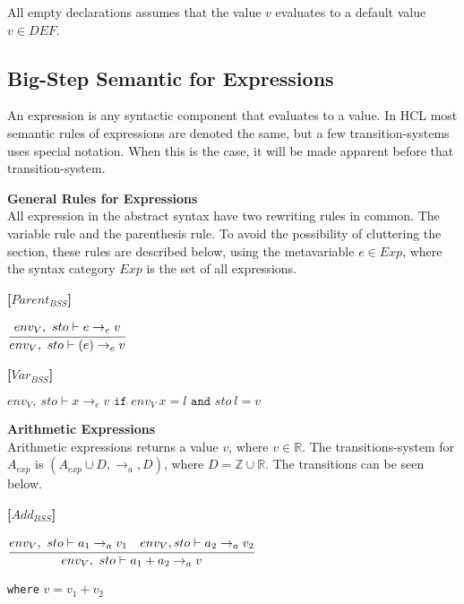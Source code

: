 All empty declarations assumes that the value $v$ evaluates to a default value $v \in DEF$.

\subsection{Big-Step Semantic for Expressions}
An expression is any syntactic component that evaluates to a value.
In HCL most semantic rules of expressions are denoted the same, but a few transition-systems uses special notation.
When this is the case, it will be made apparent before that transition-system.

\textbf{\large{General Rules for Expressions}} \\
All expression in the abstract syntax have two rewriting rules in common.
The variable rule and the parenthesis rule.
To avoid the possibility of cluttering the section, these rules are described below, using the metavariable $e \in Exp$, where the syntax category $Exp$ is the set of all expressions.

\textbf{[$Parent_{BSS}$]}
\begin{center}
	\begin{math}
	\cfrac
		{env_V,\ sto \vdash e \rightarrow_e v}
		{env_V,\ sto \vdash (e) \rightarrow_e v}
	\end{math}
\end{center}

\textbf{[$Var_{BSS}$]}
\begin{center}
	\begin{math}
	env_V,\ sto \vdash x \rightarrow_e v
	\texttt{ if } env_V\ x = l
	\texttt{ and } sto\ l = v
	\end{math}
\end{center}

\textbf{\large{Arithmetic Expressions}}\\
Arithmetic expressions returns a value $v$, where $v \in \mathbb{R}$.
The transitions-system for $A_{exp}$ is $(A_{exp} \cup D, \rightarrow_a, D)$, 
where $D = \mathbb{Z} \cup \mathbb{R}$.
The transitions can be seen below.

\textbf{[$Add_{BSS}$]}\\
\begin{center}
	\begin{math}
	\cfrac
		{env_V,\ sto \vdash a_1 \rightarrow_a v_1 \quad env_V, sto \vdash a_2 \rightarrow_a v_2}
		{env_V,\ sto \vdash a_1 + a_2 \rightarrow_a v}
	\end{math}
	
	
	\texttt{where} $v = v_1 + v_2$
\end{center}


